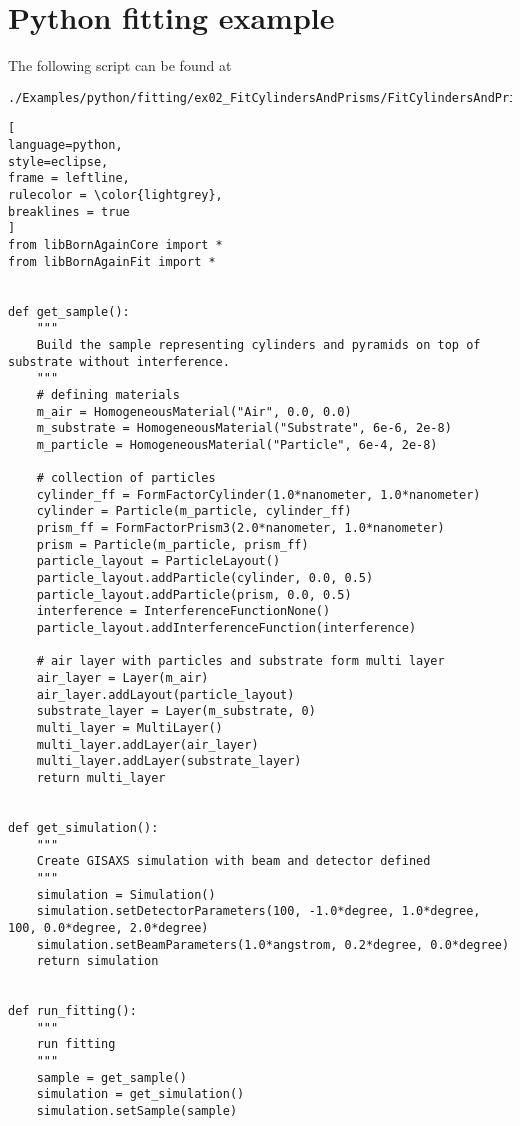\section{Python fitting example} \label{PythonFittingExampleScript}

The following script can be found at
\begin{lstlisting}[language=shell, style=commandline]
./Examples/python/fitting/ex02_FitCylindersAndPrisms/FitCylindersAndPrisms.py
\end{lstlisting}

\begin{lstlisting}[
language=python, 
style=eclipse, 
frame = leftline, 
rulecolor = \color{lightgrey},
breaklines = true
]
from libBornAgainCore import *
from libBornAgainFit import *


def get_sample():
    """
    Build the sample representing cylinders and pyramids on top of substrate without interference.
    """
    # defining materials
    m_air = HomogeneousMaterial("Air", 0.0, 0.0)
    m_substrate = HomogeneousMaterial("Substrate", 6e-6, 2e-8)
    m_particle = HomogeneousMaterial("Particle", 6e-4, 2e-8)

    # collection of particles
    cylinder_ff = FormFactorCylinder(1.0*nanometer, 1.0*nanometer)
    cylinder = Particle(m_particle, cylinder_ff)
    prism_ff = FormFactorPrism3(2.0*nanometer, 1.0*nanometer)
    prism = Particle(m_particle, prism_ff)
    particle_layout = ParticleLayout()
    particle_layout.addParticle(cylinder, 0.0, 0.5)
    particle_layout.addParticle(prism, 0.0, 0.5)
    interference = InterferenceFunctionNone()
    particle_layout.addInterferenceFunction(interference)

    # air layer with particles and substrate form multi layer
    air_layer = Layer(m_air)
    air_layer.addLayout(particle_layout)
    substrate_layer = Layer(m_substrate, 0)
    multi_layer = MultiLayer()
    multi_layer.addLayer(air_layer)
    multi_layer.addLayer(substrate_layer)
    return multi_layer


def get_simulation():
    """
    Create GISAXS simulation with beam and detector defined
    """
    simulation = Simulation()
    simulation.setDetectorParameters(100, -1.0*degree, 1.0*degree, 100, 0.0*degree, 2.0*degree)
    simulation.setBeamParameters(1.0*angstrom, 0.2*degree, 0.0*degree)
    return simulation


def run_fitting():
    """
    run fitting
    """
    sample = get_sample()
    simulation = get_simulation()
    simulation.setSample(sample)


\end{lstlisting}

